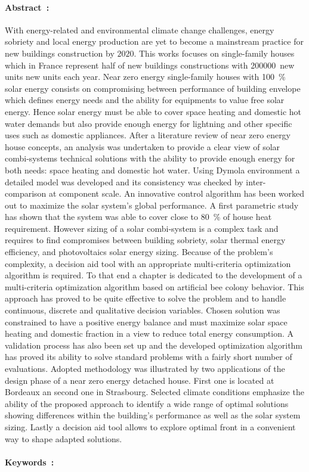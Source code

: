 \paragraph{Abstract~:}
With energy-related and environmental climate change challenges, energy sobriety and local
energy production are yet to become a mainstream practice for new buildings construction by
$2020$. This works focuses on single-family houses which in France represent half of new
buildings constructions with \si{200000}~new units new units each year.
Near zero energy single-family houses with \SI{100}{\percent} solar energy consists on compromising
between performance of building envelope which defines energy needs and the ability
for equipments to value free solar energy. Hence solar energy must be able to cover
space heating and domestic hot water demands but also provide enough energy for
lightning and other specific uses such as domestic appliances.
After a literature review of near zero energy house concepts, an analysis was undertaken
to provide a clear view of solar combi-systems technical solutions with the ability to
provide enough energy for both needs: space heating and domestic hot water. Using Dymola
environment a detailed model was developed and its consistency was checked by
inter-comparison at component scale. An innovative control algorithm has been worked out to
maximize the solar system’s global performance. A first parametric study has shown that the system
was able to cover close to \SI{80}{\percent} of house heat requirement. However sizing of a solar
combi-system is a complex task and requires to find compromises between building sobriety, solar
thermal energy efficiency, and photovoltaics solar energy sizing. Because of the problem’s
complexity, a decision aid tool with an appropriate multi-criteria optimization algorithm
is required.
To that end a chapter is dedicated to the development of a multi-criteria optimization
algorithm based on artificial bee colony behavior. This approach has proved to be quite effective
to solve the problem and to handle continuous, discrete and qualitative decision variables.
Chosen solution was constrained to have a positive energy balance and must maximize solar
space heating and domestic fraction in a view to reduce total energy consumption.
A validation process has also been set up and the developed optimization algorithm
has proved its ability to solve standard problems with a fairly short number of evaluations.
Adopted methodology was illustrated by two applications of the design phase of
a near zero energy detached house. First one is located at Bordeaux an second one
in Strasbourg. Selected climate conditions emphasize the ability of the proposed
approach to identify a wide range of optimal solutions showing differences within
the building's performance as well as the solar system sizing. Lastly a decision aid tool
allows to explore optimal front in a convenient way to shape adapted solutions. \\ \\
\noindent\textbf{Keywords~: } \keywordsENG

\normalsize
